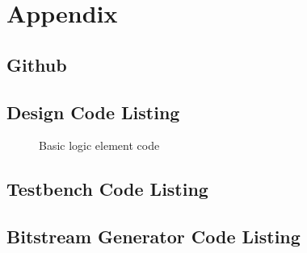 \documentclass[12pt]{article}
\begin{document}
\newpage
\section{Appendix}

\subsection{Github}

\subsection{Design Code Listing}

\begin{figure}[ht]
    
    \caption{Basic logic element code}
    \label{code:ble}
\end{figure}

\subsection{Testbench Code Listing}


\subsection{Bitstream Generator Code Listing}
\end{document}
